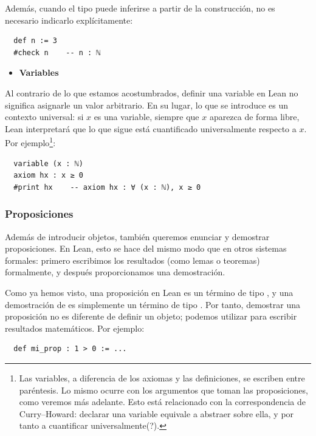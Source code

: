 Además, cuando el tipo puede inferirse a partir de la construcción, no es necesario indicarlo explícitamente:

\begin{lstlisting}
  def n := 3
  #check n    -- n : ℕ
\end{lstlisting}

\begin{itemize}
  \item \textbf{Variables}
\end{itemize}

Al contrario de lo que estamos acostumbrados, definir una variable en Lean no significa asignarle un valor arbitrario. En su lugar, lo que se introduce es un contexto universal: si $x$ es una variable, siempre que $x$ aparezca de forma libre, Lean interpretará que lo que sigue está cuantificado universalmente respecto a $x$. Por ejemplo\footnote{Las variables, a diferencia de los axiomas y las definiciones, se escriben entre paréntesis. Lo mismo ocurre con los argumentos que toman las proposiciones, como veremos más adelante. Esto está relacionado con la correspondencia de Curry–Howard: declarar una variable equivale a abstraer sobre ella, y por tanto a cuantificar universalmente(?).}:

\begin{lstlisting}
  variable (x : ℕ)
  axiom hx : x ≥ 0
  #print hx    -- axiom hx : ∀ (x : ℕ), x ≥ 0
\end{lstlisting}

\subsubsection{Proposiciones}

Además de introducir objetos, también queremos enunciar y demostrar proposiciones. En Lean, esto se hace del mismo modo que en otros sistemas formales: primero escribimos los resultados (como lemas o teoremas) formalmente, y después proporcionamos una demostración.

Como ya hemos visto, una proposición en Lean es un término de tipo , y una demostración de  es simplemente un término de tipo . Por tanto, demostrar una proposición no es diferente de definir un objeto; podemos utilizar  para escribir resultados matemáticos. Por ejemplo:

\begin{lstlisting}
  def mi_prop : 1 > 0 := ...
\end{lstlisting}

